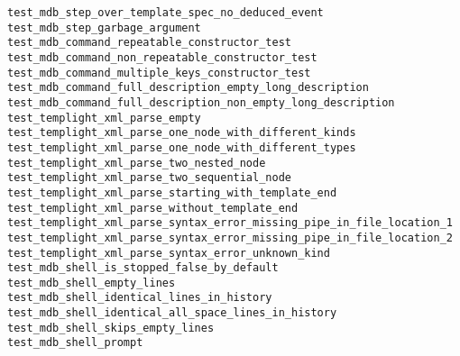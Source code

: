 \begin{description}
    \item[\texttt{test\_mdb\_step\_over\_template\_spec\_no\_deduced\_event}]
    \item[\texttt{test\_mdb\_step\_garbage\_argument}]
    \item[\texttt{test\_mdb\_command\_repeatable\_constructor\_test}]
    \item[\texttt{test\_mdb\_command\_non\_repeatable\_constructor\_test}]
    \item[\texttt{test\_mdb\_command\_multiple\_keys\_constructor\_test}]
    \item[\texttt{test\_mdb\_command\_full\_description\_empty\_long\_description}]
    \item[\texttt{test\_mdb\_command\_full\_description\_non\_empty\_long\_description}]
    \item[\texttt{test\_templight\_xml\_parse\_empty}]
    \item[\texttt{test\_templight\_xml\_parse\_one\_node\_with\_different\_kinds}]
    \item[\texttt{test\_templight\_xml\_parse\_one\_node\_with\_different\_types}]
    \item[\texttt{test\_templight\_xml\_parse\_two\_nested\_node}]
    \item[\texttt{test\_templight\_xml\_parse\_two\_sequential\_node}]
    \item[\texttt{test\_templight\_xml\_parse\_starting\_with\_template\_end}]
    \item[\texttt{test\_templight\_xml\_parse\_without\_template\_end}]
    \item[\texttt{test\_templight\_xml\_parse\_syntax\_error\_missing\_pipe\_in\_file\_location\_1}]
    \item[\texttt{test\_templight\_xml\_parse\_syntax\_error\_missing\_pipe\_in\_file\_location\_2}]
    \item[\texttt{test\_templight\_xml\_parse\_syntax\_error\_unknown\_kind}]
    \item[\texttt{test\_mdb\_shell\_is\_stopped\_false\_by\_default}]
    \item[\texttt{test\_mdb\_shell\_empty\_lines}]
    \item[\texttt{test\_mdb\_shell\_identical\_lines\_in\_history}]
    \item[\texttt{test\_mdb\_shell\_identical\_all\_space\_lines\_in\_history}]
    \item[\texttt{test\_mdb\_shell\_skips\_empty\_lines}]
    \item[\texttt{test\_mdb\_shell\_prompt}]

\end{description}
